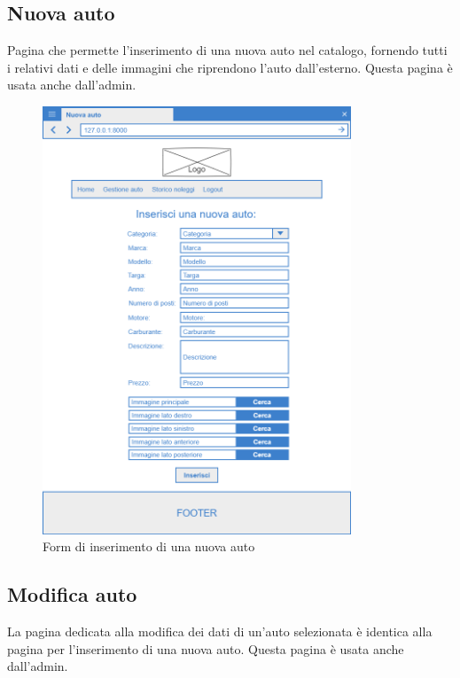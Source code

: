 \documentclass[12pt,a4paperS]{report}
\begin{document}
\begin{normalsize}
			\subsection{Nuova auto}
				Pagina che permette l'inserimento di una nuova auto nel catalogo, fornendo tutti i relativi dati e delle immagini che riprendono l'auto dall'esterno.
				\newline
				Questa pagina è usata anche dall'admin.
				\begin{figure}[H]
					\centering
					\includegraphics[width=0.82\textwidth, height=0.82\textheight, keepaspectratio]{Mockup/Nuova_auto.png}
					\caption{Form di inserimento di una nuova auto}
				\end{figure}
			
			\subsection{Modifica auto}
				La pagina dedicata alla modifica dei dati di un'auto selezionata è identica alla pagina per l'inserimento di una nuova auto.
				\newline
				Questa pagina è usata anche dall'admin.
			

\end{normalsize}
\end{document}
